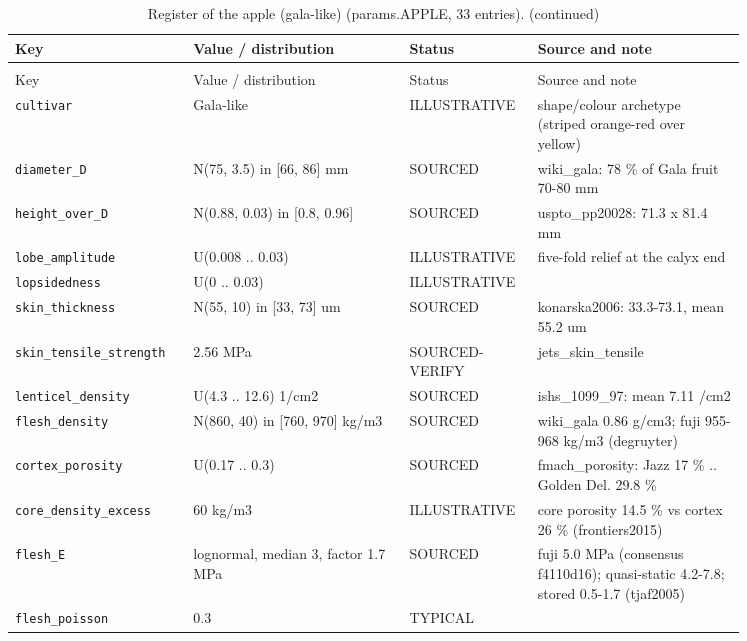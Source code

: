 \documentclass[10.5pt,a4paper]{article}
\begin{document}
{\scriptsize\begin{longtable}{@{}p{0.2\linewidth}p{0.27\linewidth}p{0.12\linewidth}p{0.26\linewidth}@{}}\caption{Register of the apple (gala-like) (params.APPLE, 33 entries).}\\\toprule Key & Value / distribution & Status & Source and note \\\midrule\endfirsthead
\caption[]{Register of the apple (gala-like) (params.APPLE, 33 entries). (continued)}\\\toprule Key & Value / distribution & Status & Source and note \\\midrule\endhead
\texttt{cultivar} & Gala-like & ILLUSTRATIVE & shape/colour archetype (striped orange-red over yellow) \\
\texttt{diameter\_\allowbreak{}D} & N(75, 3.5) in [66, 86] mm & SOURCED & wiki\_gala: 78 \% of Gala fruit 70-80 mm \\
\texttt{height\_\allowbreak{}over\_\allowbreak{}D} & N(0.88, 0.03) in [0.8, 0.96] & SOURCED & uspto\_pp20028: 71.3 x 81.4 mm \\
\texttt{lobe\_\allowbreak{}amplitude} & U(0.008 .. 0.03) & ILLUSTRATIVE & five-fold relief at the calyx end \\
\texttt{lopsidedness} & U(0 .. 0.03) & ILLUSTRATIVE &  \\
\texttt{skin\_\allowbreak{}thickness} & N(55, 10) in [33, 73] um & SOURCED & konarska2006: 33.3-73.1, mean 55.2 um \\
\texttt{skin\_\allowbreak{}tensile\_\allowbreak{}strength} & 2.56 MPa & SOURCED-VERIFY & jets\_skin\_tensile \\
\texttt{lenticel\_\allowbreak{}density} & U(4.3 .. 12.6) 1/cm2 & SOURCED & ishs\_1099\_97: mean 7.11 /cm2 \\
\texttt{flesh\_\allowbreak{}density} & N(860, 40) in [760, 970] kg/m3 & SOURCED & wiki\_gala 0.86 g/cm3; fuji 955-968 kg/m3 (degruyter) \\
\texttt{cortex\_\allowbreak{}porosity} & U(0.17 .. 0.3) & SOURCED & fmach\_porosity: Jazz 17 \% .. Golden Del. 29.8 \% \\
\texttt{core\_\allowbreak{}density\_\allowbreak{}excess} & 60 kg/m3 & ILLUSTRATIVE & core porosity 14.5 \% vs cortex 26 \% (frontiers2015) \\
\texttt{flesh\_\allowbreak{}E} & lognormal, median 3, factor 1.7 MPa & SOURCED & fuji 5.0 MPa (consensus f4110d16); quasi-static 4.2-7.8; stored 0.5-1.7 (tjaf2005) \\
\texttt{flesh\_\allowbreak{}poisson} & 0.3 & TYPICAL &  \\

\end{longtable}}
\end{document}
